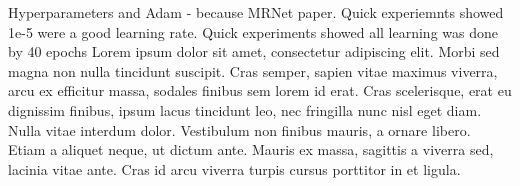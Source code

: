 \documentclass[10pt,twocolumn,letterpaper]{article}
\begin{document}











Hyperparameters and Adam - because MRNet paper. Quick experiemnts showed 1e-5 were a good learning rate. Quick experiments showed all learning was done by 40 epochs
Lorem ipsum dolor sit amet, consectetur adipiscing elit. Morbi sed magna non nulla tincidunt suscipit. Cras semper, sapien vitae maximus viverra, arcu ex efficitur massa, sodales finibus sem lorem id erat. Cras scelerisque, erat eu dignissim finibus, ipsum lacus tincidunt leo, nec fringilla nunc nisl eget diam. Nulla vitae interdum dolor. Vestibulum non finibus mauris, a ornare libero. Etiam a aliquet neque, ut dictum ante. Mauris ex massa, sagittis a viverra sed, lacinia vitae ante. Cras id arcu viverra turpis cursus porttitor in et ligula.
\end{document}
